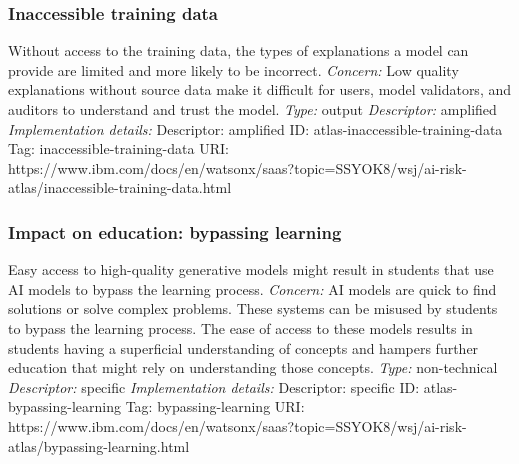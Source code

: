 \documentclass{article}
\begin{document}
\subsubsection*{Inaccessible training data}
Without access to the training data, the types of explanations a model can provide are limited and more likely to be incorrect.\newline
\textit{Concern: }Low quality explanations without source data make it difficult for users, model validators, and auditors to understand and trust the model.\newline\newline
\textit{Type: }output\newline
\textit{Descriptor: }amplified \newline\newline
\textit{Implementation details:} \newline
Descriptor: amplified \newline
ID: atlas-inaccessible-training-data \newline
Tag: inaccessible-training-data \newline
URI:  https://www.ibm.com/docs/en/watsonx/saas?topic=SSYOK8/wsj/ai-risk-atlas/inaccessible-training-data.html\newline
\subsubsection*{Impact on education: bypassing learning}
Easy access to high-quality generative models might result in students that use AI models to bypass the learning process.\newline
\textit{Concern: }AI models are quick to find solutions or solve complex problems. These systems can be misused by students to bypass the learning process. The ease of access to these models results in students having a superficial understanding of concepts and hampers further education that might rely on understanding those concepts.\newline\newline
\textit{Type: }non-technical\newline
\textit{Descriptor: }specific \newline\newline
\textit{Implementation details:} \newline
Descriptor: specific \newline
ID: atlas-bypassing-learning \newline
Tag: bypassing-learning \newline
URI:  https://www.ibm.com/docs/en/watsonx/saas?topic=SSYOK8/wsj/ai-risk-atlas/bypassing-learning.html\newline
\end{document}

